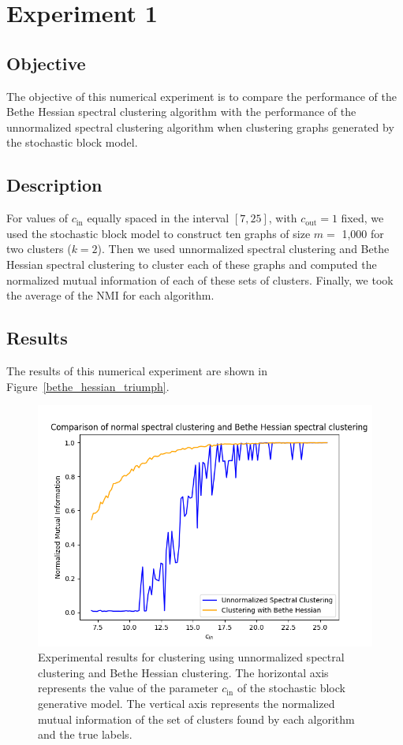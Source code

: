 \section{Experiment 1}
\subsection*{Objective}
The objective of this numerical experiment is to compare the performance of the Bethe Hessian spectral clustering algorithm with the performance of the unnormalized spectral clustering algorithm when clustering graphs generated by the stochastic block model.
\subsection*{Description}
For values of $c_\text{in}$ equally spaced in the interval $[7,25]$, with $c_\text{out} = 1$ fixed, we used the stochastic block model to construct ten graphs of size $m =$ 1,000 for two clusters ($k = 2$).
Then we used unnormalized spectral clustering and Bethe Hessian spectral clustering to cluster each of these graphs and computed the normalized mutual information of each of these sets of clusters.
Finally, we took the average of the NMI for each algorithm.

\subsection*{Results}
The results of this numerical experiment are shown in Figure~\vref{bethe_hessian_triumph}.

\begin{figure}[h]
\begin{center}
\includegraphics[width=14cm]{figures/bethe_hessian_triumph.png}
\end{center}
   \caption[Experimental results for clustering using unnormalized spectral clustering and Bethe Hessian clustering]{Experimental results for clustering using unnormalized spectral clustering and Bethe Hessian clustering. The horizontal axis represents the value of the parameter $c_\text{in}$ of the stochastic block generative model. The vertical axis represents the normalized mutual information of the set of clusters found by each algorithm and the true labels.}
\label{bethe_hessian_triumph}
\end{figure}

